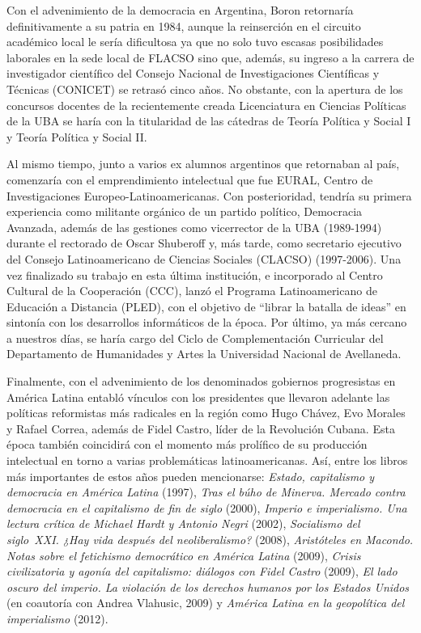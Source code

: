 Con el advenimiento de la democracia en Argentina, Boron retornaría definitivamente a su patria en 1984, aunque la reinserción en el circuito académico local le sería dificultosa ya que no solo tuvo escasas posibilidades laborales en la sede local de FLACSO sino que, además, su ingreso a la carrera de investigador científico del Consejo Nacional de Investigaciones Científicas y Técnicas (CONICET) se retrasó cinco años. No obstante, con la apertura de los concursos docentes de la recientemente creada Licenciatura en Ciencias Políticas de la UBA se haría con la titularidad de las cátedras de Teoría Política y Social I y Teoría Política y Social II.

Al mismo tiempo, junto a varios ex alumnos argentinos que retornaban al país, comenzaría con el emprendimiento intelectual que fue EURAL, Centro de Investigaciones Europeo-Latinoamericanas. Con posterioridad, tendría su primera experiencia como militante orgánico de un partido político, Democracia Avanzada, además de las gestiones como vicerrector de la UBA (1989-1994) durante el rectorado de Oscar Shuberoff y, más tarde, como secretario ejecutivo del Consejo Latinoamericano de Ciencias Sociales (CLACSO) (1997-2006). Una vez finalizado su trabajo en esta última institución, e incorporado al Centro Cultural de la Cooperación (CCC), lanzó el Programa Latinoamericano de Educación a Distancia (PLED), con el objetivo de \enquote{librar la batalla de ideas} en sintonía con los desarrollos informáticos de la época. Por último, ya más cercano a nuestros días, se haría cargo del Ciclo de Complementación Curricular del Departamento de Humanidades y Artes la Universidad Nacional de Avellaneda.

Finalmente, con el advenimiento de los denominados gobiernos progresistas en América Latina entabló vínculos con los presidentes que llevaron adelante las políticas reformistas más radicales en la región como Hugo Chávez, Evo Morales y Rafael Correa, además de Fidel Castro, líder de la Revolución Cubana. Esta época también coincidirá con el momento más prolífico de su producción intelectual en torno a varias problemáticas latinoamericanas. Así, entre los libros más importantes de estos años pueden mencionarse: \emph{Estado, capitalismo y democracia en América Latina} (1997), \emph{Tras el búho de Minerva. Mercado contra democracia en el capitalismo de fin de siglo} (2000), \emph{Imperio e imperialismo. Una lectura crítica de Michael Hardt y Antonio Negri} (2002), \emph{Socialismo del siglo~XXI. ¿Hay vida después del neoliberalismo?} (2008), \emph{Aristóteles en Macondo. Notas sobre el fetichismo democrático en América Latina} (2009), \emph{Crisis civilizatoria y agonía del capitalismo: diálogos con Fidel Castro} (2009), \emph{El lado oscuro del imperio. La violación de los derechos humanos por los Estados Unidos} (en coautoría con Andrea Vlahusic, 2009) y \emph{América Latina en la geopolítica del imperialismo} (2012).

